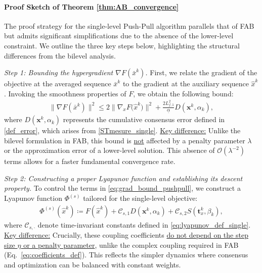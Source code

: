 \documentclass{article}
\theoremstyle{plain}
\theoremstyle{definition}
\theoremstyle{remark}
\begin{document}
\paragraph{Proof Sketch of Theorem \ref{thm:AB_convergence}}
\label{app:pushpull_sketch}
The proof strategy for the single-level Push-Pull algorithm parallels that of FAB but admits significant simplifications due to the absence of the lower-level constraint. We outline the three key steps below, highlighting the structural differences from the bilevel analysis.

\textit{Step 1: Bounding the hypergradient $\nabla F(\bar{x}^k)$.}
First, we relate the gradient of the objective at the averaged sequence $\bar{x}^k$ to the gradient at the auxiliary sequence $\hat{x}^k$. Invoking the smoothness properties of $F$, we obtain the following bound:
\begin{align}\label{eq:grad_bound_pushpull}
     \|\nabla F(\bar{x}^k)\|^{2}  \leq  2\big\|\nabla_{x} F\big({\hat{x}}^k\big) \big\|^{2} + \frac{2 L_{f,1}^{2}}{\underline{\alpha}} D(\mathbf{x}^{k},\alpha_{k}),
\end{align}
where $D(\mathbf{x}^{k},\alpha_{k})$ represents the cumulative consensus error defined in \eqref{def_error}, which arises from \eqref{STmesure_single}.
\underline{Key difference:} Unlike the bilevel formulation in FAB, this bound is \underline{not} affected by a penalty parameter $\lambda$ or the approximation error of a lower-level solution. This absence of $\mathcal{O}(\lambda^{-2})$ terms allows for a faster fundamental convergence rate.

\textit{Step 2: Constructing a proper Lyapunov function and establishing its descent property.}
To control the terms in \eqref{eq:grad_bound_pushpull}, we construct a Lyapunov function $\Phi^{(s)}$ tailored for the single-level objective:
\begin{align}\label{eq:lyap_def_pushpull}
    \Phi^{(s)}({\hat{x}}^k) \coloneqq F({\hat{x}}^k) + \mathcal{C}_{s,1} D(\mathbf{x}^{k}, \alpha_{k}) + \mathcal{C}_{s,2} S(\mathbf{t}_{x}^{k}, \beta_{k}),
\end{align}
where $\mathcal{C}_{s,\cdot}$ denote time-invariant constants defined in \eqref{eq:lyapunov_def_single}.
\underline{Key difference:} Crucially, these coupling coefficients \underline{do not depend on the step size $\eta$ or a penalty parameter}, unlike the complex coupling required in FAB (Eq.~\eqref{eq:coefficients_def}). This reflects the simpler dynamics where consensus and optimization can be balanced with constant weights.
\end{document}
